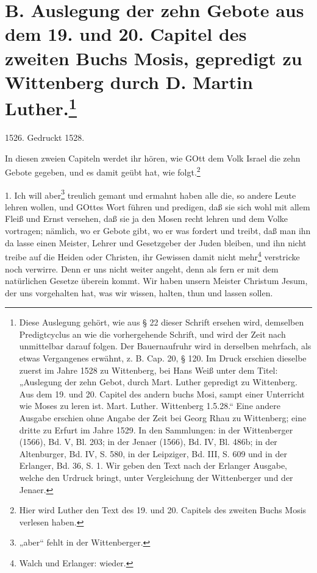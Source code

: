 \chapter[B. Auslegung der zehn Gebote]{B. Auslegung der zehn Gebote aus dem 19. und 20. Capitel des zweiten Buchs Mosis, gepredigt zu Wittenberg durch D. Martin Luther.\footnote{Diese Auslegung gehört, wie aus § 22 dieser Schrift ersehen wird, demselben Predigtcyclus an wie die vorhergehende Schrift, und wird der Zeit nach unmittelbar darauf folgen. Der Bauernaufruhr wird in derselben mehrfach, als etwas Vergangenes erwähnt, z. B. Cap. 20, § 120. Im Druck erschien dieselbe zuerst im Jahre 1528 zu Wittenberg, bei Hans Weiß unter dem Titel: „Auslegung der zehn Gebot, durch Mart. Luther gepredigt zu Wittenberg. Aus dem 19. und 20. Capitel des andern buchs Mosi, sampt einer Unterricht wie Moses zu leren ist. Mart. Luther. Wittenberg 1.5.28.“ Eine andere Ausgabe erschien ohne Angabe der Zeit bei Georg Rhau zu Wittenberg; eine dritte zu Erfurt im Jahre 1529. In den Sammlungen: in der Wittenberger (1566), Bd. V, Bl. 203; in der Jenaer (1566), Bd. IV, Bl. 486b; in der Altenburger, Bd. IV, S. 580, in der Leipziger, Bd. III, S. 609 und in der Erlanger, Bd. 36, S. 1. Wir geben den Text nach der Erlanger Ausgabe, welche den Urdruck bringt, unter Vergleichung der Wittenberger und der Jenaer.}}

1526. Gedruckt 1528.

In diesen zweien Capiteln werdet ihr hören, wie GOtt dem Volk Israel die zehn Gebote gegeben, und es damit geübt hat, wie folgt.\footnote{Hier wird Luther den Text des 19. und 20. Capitels des zweiten Buchs Mosis verlesen haben.}

1. Ich will aber\footnote{„aber“ fehlt in der Wittenberger.} treulich gemant und ermahnt haben alle die, so andere Leute lehren wollen, und GOttes Wort führen und predigen, daß sie sich wohl mit allem Fleiß und Ernst versehen, daß sie ja den Mosen recht lehren und dem Volke vortragen; nämlich, wo er Gebote gibt, wo er was fordert und treibt, daß man ihn da lasse einen Meister, Lehrer und Gesetzgeber der Juden bleiben, und ihn nicht treibe auf die Heiden oder Christen, ihr Gewissen damit nicht mehr\footnote{Walch und Erlanger: wieder.} verstricke noch verwirre. Denn er uns nicht weiter angeht, denn als fern er mit dem natürlichen Gesetze überein kommt. Wir haben unsern Meister Christum Jesum, der uns vorgehalten hat, was wir wissen, halten, thun und lassen sollen.

